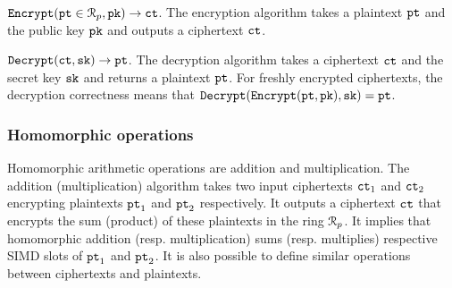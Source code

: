 ${\mathtt{Encrypt}}({\mathtt{pt}} \in \mathcal{R}_p, {\mathtt{pk}}) \rightarrow {\mathtt{ct}}$. The encryption algorithm takes a plaintext ${\mathtt{pt}}$ and the public key ${\mathtt{pk}}$ and outputs a ciphertext ${\mathtt{ct}}$.

${\mathtt{Decrypt}}({\mathtt{ct}}, {\mathtt{sk}}) \rightarrow {\mathtt{pt}}$. The decryption algorithm takes a ciphertext ${\mathtt{ct}}$ and the secret key ${\mathtt{sk}}$ and returns a plaintext ${\mathtt{pt}}$.
For freshly encrypted ciphertexts, the decryption correctness means that ${\mathtt{Decrypt}}({\mathtt{Encrypt}}({\mathtt{pt}}, {\mathtt{pk}}), {\mathtt{sk}}) = {\mathtt{pt}}$. 


\subsubsection{Homomorphic operations}

Homomorphic arithmetic operations are addition and multiplication.
The addition (multiplication) algorithm takes two input ciphertexts ${\mathtt{ct}}_1$ and ${\mathtt{ct}}_2$ encrypting plaintexts ${\mathtt{pt}}_1$ and ${\mathtt{pt}}_2$ respectively.
It outputs a ciphertext ${\mathtt{ct}}$ that encrypts the sum (product) of these plaintexts in the ring $\mathcal{R}_p$.
It implies that homomorphic addition (resp. multiplication) sums (resp. multiplies) respective SIMD slots of ${\mathtt{pt}}_1$ and ${\mathtt{pt}}_2$.
It is also possible to define similar operations between ciphertexts and plaintexts.  







